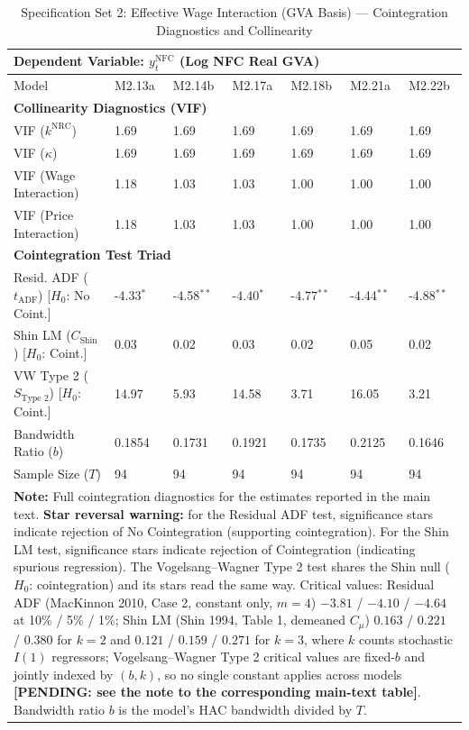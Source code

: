 \begin{table}[H]
\centering
\setlength{\tabcolsep}{2.5pt}
\caption{Specification Set 2: Effective Wage Interaction (GVA Basis) --- Cointegration Diagnostics and Collinearity}
\label{tab:specB_set2_gva_triad}
\scriptsize
\begin{tabular}{p{3.8cm}p{1.1cm}p{1.1cm}p{1.1cm}p{1.1cm}p{1.1cm}p{1.1cm}}
\toprule
\multicolumn{7}{l}{\textbf{Dependent Variable: $y_t^{\text{NFC}}$ (Log NFC Real GVA)}} \\
\midrule
Model & M2.13a & M2.14b & M2.17a & M2.18b & M2.21a & M2.22b \\
\midrule
\multicolumn{7}{l}{\textbf{Collinearity Diagnostics (VIF)}} \\
VIF ($k^{\text{NRC}}$) & 1.69 & 1.69 & 1.69 & 1.69 & 1.69 & 1.69 \\
VIF ($\kappa$) & 1.69 & 1.69 & 1.69 & 1.69 & 1.69 & 1.69 \\
VIF (Wage Interaction) & 1.18 & 1.03 & 1.03 & 1.00 & 1.00 & 1.00 \\
VIF (Price Interaction) & 1.18 & 1.03 & 1.03 & 1.00 & 1.00 & 1.00 \\
\midrule
\multicolumn{7}{l}{\textbf{Cointegration Test Triad}} \\
Resid. ADF ($t_{\text{ADF}}$) [$H_0$: No Coint.] & -4.33$^{*}$ & -4.58$^{**}$ & -4.40$^{*}$ & -4.77$^{**}$ & -4.44$^{**}$ & -4.88$^{**}$ \\
Shin LM ($C_{\text{Shin}}$) [$H_0$: Coint.] & 0.03 & 0.02 & 0.03 & 0.02 & 0.05 & 0.02 \\
VW Type 2 ($S_{\text{Type 2}}$) [$H_0$: Coint.] & 14.97 & 5.93 & 14.58 & 3.71 & 16.05 & 3.21 \\
\midrule
Bandwidth Ratio ($b$) & 0.1854 & 0.1731 & 0.1921 & 0.1735 & 0.2125 & 0.1646 \\
Sample Size ($T$) & 94 & 94 & 94 & 94 & 94 & 94 \\
\bottomrule
\multicolumn{7}{p{15cm}}{\footnotesize \textbf{Note:} Full cointegration diagnostics for the estimates reported in the main text. \textbf{Star reversal warning:} for the Residual ADF test, significance stars indicate rejection of No Cointegration (supporting cointegration). For the Shin LM test, significance stars indicate rejection of Cointegration (indicating spurious regression). The Vogelsang--Wagner Type 2 test shares the Shin null ($H_0$: cointegration) and its stars read the same way. Critical values: Residual ADF (MacKinnon 2010, Case 2, constant only, $m=4$) $-3.81$ / $-4.10$ / $-4.64$ at 10\% / 5\% / 1\%; Shin LM (Shin 1994, Table 1, demeaned $C_\mu$) $0.163$ / $0.221$ / $0.380$ for $k=2$ and $0.121$ / $0.159$ / $0.271$ for $k=3$, where $k$ counts stochastic $I(1)$ regressors; Vogelsang--Wagner Type 2 critical values are fixed-$b$ and jointly indexed by $(b, k)$, so no single constant applies across models \textbf{[PENDING: see the note to the corresponding main-text table]}. Bandwidth ratio $b$ is the model's HAC bandwidth divided by $T$.} \\
\end{tabular}
\end{table}
